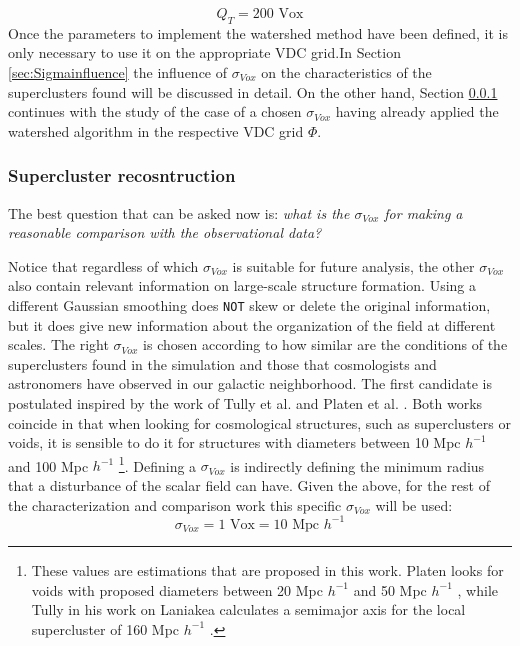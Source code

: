 \begin{equation}
    Q_T = \text{200 Vox}
\end{equation}
Once the parameters to implement the watershed method have been defined, it is only necessary to use it on the appropriate VDC grid.In Section \ref{sec:Sigmainfluence} the influence of $\sigma_{Vox}$ on the characteristics of the superclusters found will be discussed in detail. On the other hand, Section \ref{sec:superclusterRecons} continues with the study of the case of a chosen  $\sigma_{Vox}$ having already applied the watershed algorithm in the respective VDC grid $\Phi$.

\subsubsection{Supercluster recosntruction}
\label{sec:superclusterRecons}
The best question that can be asked now is: \textit{what is the  $\sigma_{Vox}$ for making a reasonable comparison with the observational data?}

Notice that regardless of which $\sigma_{Vox}$ is suitable for future analysis, the other $\sigma_{Vox}$ also contain relevant information on large-scale structure formation. Using a different Gaussian smoothing does \texttt{NOT} skew or delete the original information, but it does give new information about the organization of the field at different scales. The right $\sigma_{Vox}$ is chosen according to how similar are the conditions of the superclusters found in the simulation and those that cosmologists and astronomers have observed in our galactic neighborhood. The first candidate is postulated inspired by the work of Tully et al.\cite{tully_laniakea_2014} and Platen et al. \cite{CosmicWatershedVoidDetection}. Both works coincide in that when looking for cosmological structures, such as superclusters or voids, it is sensible to do it for structures with diameters between 10 Mpc $h^{-1}$ and 100 Mpc $h^{-1}$ \footnote{These values are estimations that are proposed in this work. Platen looks for voids with proposed diameters between 20 Mpc $h^{-1}$ and 50 Mpc $h^{-1}$ , while Tully in his work on Laniakea calculates a semimajor axis for the local supercluster of 160 Mpc $h^{-1}$ .}. Defining a  $\sigma_{Vox}$ is indirectly defining the minimum radius that a disturbance of the scalar field can have. Given the above, for the rest of the characterization and comparison work this specific $\sigma_{Vox}$ will be used:
\begin{equation}
     \sigma_{Vox} = \text{1 Vox} = \text{10 Mpc }h^{-1}
\end{equation}





